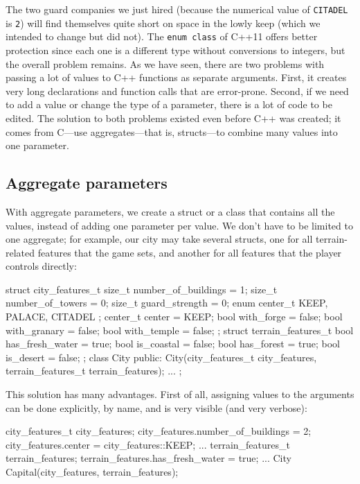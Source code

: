 The two guard companies we just hired (because the numerical value of \texttt{CITADEL} is \texttt{2}) will find themselves quite short on space in the lowly keep (which we intended to change but did not). The \texttt{enum\ class} of C++11 offers better protection since each one is a different type without conversions to integers, but the overall problem remains. As we have seen, there are two problems with passing a lot of values to C++ functions as separate arguments. First, it creates very long declarations and function calls that are error-prone. Second, if we need to add a value or change the type of a parameter, there is a lot of code to be edited. The solution to both problems existed even before C++ was created; it comes from C---use aggregates---that is, structs---to combine many values into one parameter.

\subsection{Aggregate parameters}

With aggregate parameters, we create a struct or a class that contains all the values, instead of adding one parameter per value. We don't have to be limited to one aggregate; for example, our city may take several structs, one for all terrain-related features that the game sets, and another for all features that the player controls directly:

\begin{code}
struct city_features_t {
  size_t number_of_buildings = 1;
  size_t number_of_towers = 0;
  size_t guard_strength = 0;
  enum center_t { KEEP, PALACE, CITADEL };
  center_t center = KEEP;
  bool with_forge = false;
  bool with_granary = false;
  bool with_temple = false;
};
struct terrain_features_t {
  bool has_fresh_water = true;
  bool is_coastal = false;
  bool has_forest = true;
  bool is_desert = false;
};
class City {
  public:
  City(city_features_t city_features,
       terrain_features_t terrain_features);
  ...
};
\end{code}

This solution has many advantages. First of all, assigning values to the arguments can be done explicitly, by name, and is very visible (and very verbose):

\begin{code}
city_features_t city_features;
city_features.number_of_buildings = 2;
city_features.center = city_features::KEEP;
...
terrain_features_t terrain_features;
terrain_features.has_fresh_water = true;
...
City Capital(city_features, terrain_features);
\end{code}

